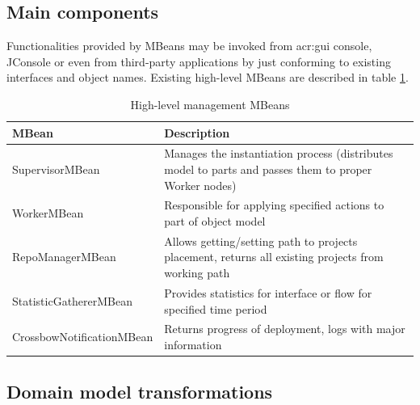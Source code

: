 \documentclass[11pt,openany]{book}
\begin{document}
      \subsection{Main components}
      \label{sec:impl:infrastructure}

        Functionalities provided by MBeans may be invoked from \gls{acr:gui} console, JConsole or even from third-party
        applications by just conforming to existing interfaces and object names. Existing high-level MBeans are
        described in table \ref{tab:impl:hl-mbean}.

        \begin{table}[H]
          \centering

          \begin{tabularx}{\textwidth}{|l|X|}
            \hline
            MBean                     & Description                                                                      \\
            \hline \hline
            SupervisorMBean           & Manages the instantiation process (distributes model to parts and passes them to
                                        proper Worker nodes)                                                             \\
            \hline
            WorkerMBean               & Responsible for applying specified actions to part of object model               \\
            \hline
            RepoManagerMBean          & Allows getting/setting path to projects placement, returns all existing projects
                                        from working path                                                                \\
            \hline
            StatisticGathererMBean    & Provides statistics for interface or flow for specified time period              \\
            \hline
            CrossbowNotificationMBean & Returns progress of deployment, logs with major information                      \\
            \hline
          \end{tabularx}

          \caption{High-level management MBeans}
          \label{tab:impl:hl-mbean}
        \end{table}


      \subsection{Domain model transformations}
      \label{sec:impl:model}
\end{document}
